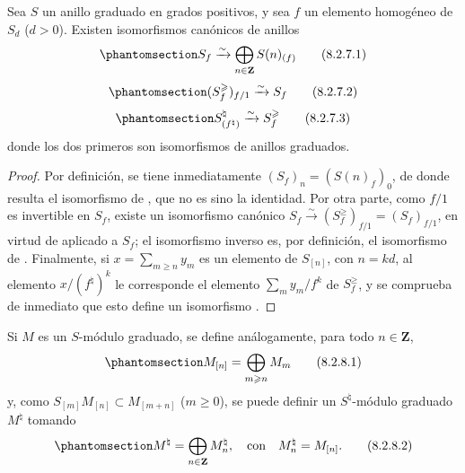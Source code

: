 \documentclass[oneside,10pt]{amsart}
\renewcommand{\geq}{\geqslant}
\newcommand{\oldpage}[2][]{\marginnote{\normalfont\footnotesize\textbf{#1}~|~#2}\ignorespaces}
\let\EGAOriginalLabel\label
\renewcommand{\label}[1]{\phantomsection\EGAOriginalLabel{#1}}
\begin{document}
\oldpage[II]{159}
\begin{lemma}[8.2.7]
\label{II.8.2.7-fr}
Sea $S$ un anillo graduado en grados positivos, y sea $f$ un elemento homogéneo de $S_d$ ($d>0$).
Existen isomorfismos canónicos de anillos
\begin{equation}
\label{II.8.2.7.1-fr}
  S_f\xrightarrow{\sim}\bigoplus_{n\in\mathbf{Z}}S(n)_{(f)}
\tag{8.2.7.1}
\end{equation}
\begin{equation}
\label{II.8.2.7.2-fr}
  (S_f^{\geq})_{f/1}\xrightarrow{\sim}S_f
\tag{8.2.7.2}
\end{equation}
\begin{equation}
\label{II.8.2.7.3-fr}
  S^\natural_{(f^\natural)}\xrightarrow{\sim}S_f^{\geq}
\tag{8.2.7.3}
\end{equation}
donde los dos primeros son isomorfismos de anillos graduados.
\end{lemma}

\begin{proof}
Por definición, se tiene inmediatamente $(S_f)_n=(S(n)_f)_0$, de donde resulta el isomorfismo de , que no es sino la identidad.
Por otra parte, como $f/1$ es invertible en $S_f$, existe un isomorfismo canónico $S_f\xrightarrow{\sim}(S_f^{\geq})_{f/1}=(S_f)_{f/1}$, en virtud de  aplicado a $S_f$;
el isomorfismo inverso es, por definición, el isomorfismo de .
Finalmente, si $x=\sum_{m\geq n}y_m$ es un elemento de $S_{[n]}$, con $n=kd$, al elemento $x/(f^\natural)^k$ le corresponde el elemento $\sum_m y_m/f^k$ de $S_f^{\geq}$, y se comprueba de inmediato que esto define un isomorfismo .
\end{proof}

\begin{env}[8.2.8]
\label{II.8.2.8-fr}
Si $M$ es un $S$-módulo graduado, se define análogamente, para todo $n\in\mathbf{Z}$,
\begin{equation}
\label{II.8.2.8.1-fr}
  M_{[n]}=\bigoplus_{m\geq n}M_m
\tag{8.2.8.1}
\end{equation}
y, como $S_{[m]}M_{[n]}\subset M_{[m+n]}$ ($m\geq0$), se puede definir un $S^\natural$-módulo graduado $M^\natural$ tomando
\begin{equation}
\label{II.8.2.8.2-fr}
  M^\natural=\bigoplus_{n\in\mathbf{Z}}M_n^\natural,
  \quad\text{con}\quad M_n^\natural=M_{[n]}.
\tag{8.2.8.2}
\end{equation}
\end{env}
\end{document}
